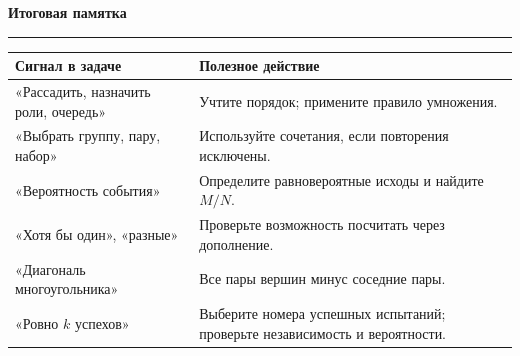 \documentclass[a4paper,11pt]{article}
\newcommand{\topic}[1]{%
 \Needspace{5\baselineskip}\par\vspace{0.75em}%
 {\large\bfseries\color{darkaccent}#1}\par\vspace{0.35em}%
 {\color{accent}\rule{\linewidth}{0.55pt}}\par\vspace{0.4em}%
}
\begin{document}
\topic{Итоговая памятка}
\begin{center}
\renewcommand{\arraystretch}{1.38}
\begin{tabularx}{\linewidth}{@{}p{.33\linewidth}X@{}}
\toprule
Сигнал в задаче & Полезное действие \\
\midrule
«Рассадить, назначить роли, очередь» & Учтите порядок; примените правило умножения. \\
«Выбрать группу, пару, набор» & Используйте сочетания, если повторения исключены. \\
«Вероятность события» & Определите равновероятные исходы и найдите \(M/N\). \\
«Хотя бы один», «разные» & Проверьте возможность посчитать через дополнение. \\
«Диагональ многоугольника» & Все пары вершин минус соседние пары. \\
«Ровно \(k\) успехов» & Выберите номера успешных испытаний; проверьте независимость и вероятности. \\
\bottomrule
\end{tabularx}
\end{center}
\end{document}
